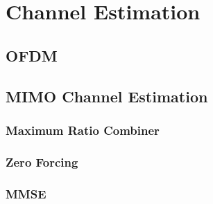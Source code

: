 \chapter{Channel Estimation}
\label{ch:ChEst}

\section{OFDM}\label{sec:OFDM}

\section{MIMO Channel Estimation}\label{sec:MIMO}

\subsection{Maximum Ratio Combiner}\label{ssec:Simple}
\subsection{Zero Forcing}\label{ssec:ZF}
\subsection{MMSE}\label{ssec:MMSE}


